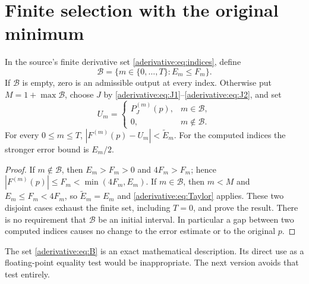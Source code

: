 \section{Finite selection with the original minimum}
\label{aderivative:sec:selection}
\begin{aderivativeproposition}\label{aderivative:prop:finite}
In the source's finite derivative set \eqref{aderivative:eq:indices}, define
\begin{equation}\label{aderivative:eq:B}
\mathcal B=\{m\in\{0,\ldots,T\}: E_m\le F_m\}.
\end{equation}
If $\mathcal B$ is empty, zero is an admissible output at every
index. Otherwise put $M=1+\max\mathcal B$, choose $J$ by
\eqref{aderivative:eq:J1}--\eqref{aderivative:eq:J2}, and set
\begin{equation}\label{aderivative:eq:output}
U_m=\begin{cases}P_J^{(m)}(p),&m\in\mathcal B,\\
0,&m\notin\mathcal B.
\end{cases}
\end{equation}
For every $0\le m\le T$,
$|F^{(m)}(p)-U_m|<\widetilde E_m$.
For the computed indices the stronger error bound is $E_m/2$.
\end{aderivativeproposition}
\begin{proof}
If $m\notin\mathcal B$, then $E_m>F_m>0$ and $4F_m>F_m$;
hence $|F^{(m)}(p)|\le F_m<\min(4F_m,E_m)$.
If $m\in\mathcal B$, then $m<M$ and
$E_m\le F_m<4F_m$, so $\widetilde E_m=E_m$ and
\eqref{aderivative:eq:Taylor} applies. These two disjoint cases exhaust
the finite set, including $T=0$, and prove the result.
There is no requirement that $\mathcal B$ be an initial interval.
In particular a gap between two computed indices causes no
change to the error estimate or to the original $p$.
\end{proof}

The set \eqref{aderivative:eq:B} is an exact mathematical description.
Its direct use as a floating-point equality test would be
inappropriate. The next version avoids that test entirely.

